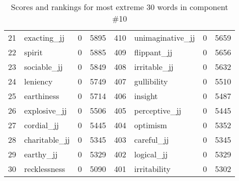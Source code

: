 \begin{table}[tbp]
\begin{tabular}{| rlr@{.}l | rlr@{.}l |}
    21 & exacting\_jj & 0 & 5895    &    410 & unimaginative\_jj & 0 & 5659 \\
    22 & spirit & 0 & 5885    &    409 & flippant\_jj & 0 & 5656 \\
    23 & sociable\_jj & 0 & 5849    &    408 & irritable\_jj & 0 & 5632 \\
    24 & leniency & 0 & 5749    &    407 & gullibility & 0 & 5510 \\
    25 & earthiness & 0 & 5714    &    406 & insight & 0 & 5487 \\
    26 & explosive\_jj & 0 & 5506    &    405 & perceptive\_jj & 0 & 5445 \\
    27 & cordial\_jj & 0 & 5445    &    404 & optimism & 0 & 5352 \\
    28 & charitable\_jj & 0 & 5345    &    403 & careful\_jj & 0 & 5345 \\
    29 & earthy\_jj & 0 & 5329    &    402 & logical\_jj & 0 & 5329 \\
    30 & recklessness & 0 & 5090    &    401 & irritability & 0 & 5302 \\
    \hline
    \end{tabular}
    \caption{Scores and rankings for most extreme 30 words in component \#10} 
\end{table}
\clearpage
